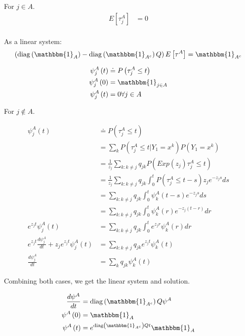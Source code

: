 \documentclass[12pt]{article}
\DeclareMathOperator{\diag}{diag}
\begin{document}
For $j \in A$.
\begin{align}
	E\left[\tau^{A}_{j}\right] &= 0 \\
\end{align}

As a linear system:
\begin{align}
	\left(\diag\left(\mathbbm{1}_A\right) - \diag\left(\mathbbm{1}_{A^c}\right)Q\right)E\left[\tau^{A}\right] =\mathbbm{1}_{A^c}\\
\end{align}


\begin{align}
\psi_j^A\left(t\right) &\doteq P\left(\tau^A_j \leq t\right) \\
\psi_j^A\left(0\right) &= \mathbbm{1}_{j\in A} \\
\psi_j^A\left(t\right) &= 0 \forall j \in A \\                       
\end{align}

For $j \not\in A$.

\begin{align}
\psi_j^A\left(t\right) &\doteq P\left(\tau^A_j \leq t\right) \\
                       &= \sum_k P\left(\tau^A_j \leq t | Y_1 = x^k\right) P\left(Y_1 = x^k\right) \\ 
                       &= \frac{1}{z_j}\sum_{k: k \neq j} q_{jk} P\left(Exp\left(z_j\right)\tau^A_j \leq t\right)  \\
                       &= \frac{1}{z_j}\sum_{k: k \neq j} q_{jk} \int^t_0 P\left(\tau^A_j \leq t - s\right) z_j e^{-z_j s} ds  \\
                       &= \sum_{k: k \neq j} q_{jk} \int^t_0\psi^A_k\left(t-s\right)e^{-z_j s} ds  \\
                       &= \sum_{k: k \neq j} q_{jk} \int^t_0\psi^A_k\left(r\right)e^{-z_j\left(t-r\right)} dr  \\
e^{z_jt}\psi^A_j\left(t\right) &= \sum_{k: k \neq j} q_{jk} \int^t_0 e^{z_jr}\psi^A_k\left(r\right) dr  \\
e^{z_jt}\frac{d\psi^A_j}{dt} + z_j e^{z_j t} \psi^A_j\left(t\right) &= \sum_{k: k \neq j} q_{jk} e^{z_jt}\psi^A_k\left(t\right)  \\
\frac{d\psi^A_j}{dt} &= \sum_{k} q_{jk} \psi^A_k\left(t\right) 
\end{align}

Combining both cases, we get the linear system and solution.

\begin{align}
        \frac{d\psi^A}{dt} &= \diag\left(\mathbbm{1}_{A^c}\right)Q\psi^A \\
        \psi^A\left(0\right) &= \mathbbm{1}_{A} \\
        \psi^A\left(t\right) &= e^{\diag\left(\mathbbm{1}_{A^c}\right)Qt} \mathbbm{1}_{A} \\ 
\end{align}
\end{document}
